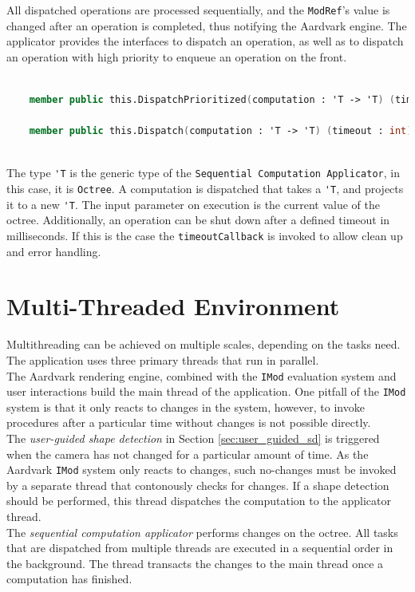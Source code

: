 All dispatched operations are processed sequentially, and the \verb|ModRef|'s value is changed after an operation is completed, thus notifying the Aardvark engine. 
The applicator provides the interfaces to dispatch an operation, as well as to dispatch an operation with high priority to enqueue an operation on the front. 

\begin{lstlisting}[language = FSharp]

    member public this.DispatchPrioritized(computation : 'T -> 'T) (timeout : int) (timeoutCallback  : unit -> unit) : unit = ...

    member public this.Dispatch(computation : 'T -> 'T) (timeout : int) (timeoutCallback  : unit -> unit) : unit = ...
   
\end{lstlisting}

The type \verb|'T| is the generic type of the \verb|Sequential Computation Applicator|, in this case, it is \verb|Octree|. A computation is dispatched that takes a \verb|'T|, and projects it to a new \verb|'T|. The input parameter on execution is the current value of the octree. 
Additionally, an operation can be shut down after a defined timeout in milliseconds. If this is the case the \verb|timeoutCallback| is invoked to allow clean up and error handling. 


\section{Multi-Threaded Environment}
\label {sec:multithreading}

Multithreading can be achieved on multiple scales, depending on the tasks need. The application uses three primary threads that run in parallel. 
\\
The Aardvark rendering engine, combined with the \verb|IMod| evaluation system and user interactions build the main thread of the application. One pitfall of the \verb|IMod| system is that it only reacts to changes in the system, however, to invoke procedures after a particular time without changes is not possible directly. 
\\


The \textit{user-guided shape detection} in Section \ref{sec:user_guided_sd} is triggered when the camera has not changed for a particular amount of time. As the Aardvark \verb|IMod| system only reacts to changes, such no-changes must be invoked by a separate thread that contonously checks for changes. If a shape detection should be performed, this thread dispatches the computation to the applicator thread.
\\
The \textit{sequential computation applicator} performs changes on the octree. All tasks that are dispatched from multiple threads are executed in a sequential order in the background. The thread transacts the changes to the main thread once a computation has finished. 


